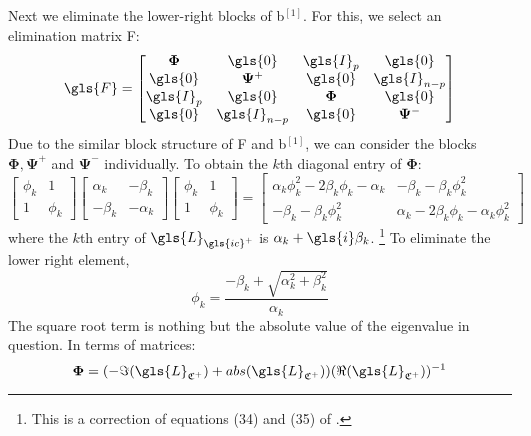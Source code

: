 Next we eliminate the lower-right blocks of \gls{b}$^{[1]}$. For this, we select
an elimination matrix \gls{F}:
\begin{align}
	\gls{F} = \begin{bmatrix}
		\mathbf{\Phi} & \gls{0} & \gls{I}_{p} & \gls{0} \\
		\gls{0} & \mathbf{\Psi}^+ & \gls{0} & \gls{I}_{n-p} \\
		\gls{I}_{p} & \gls{0} & \mathbf{\Phi} & \gls{0} \\
		\gls{0} & \gls{I}_{n-p} & \gls{0} & \mathbf{\Psi}^-
	\end{bmatrix}
\end{align}
Due to the similar block structure of \gls{F} and \gls{b}$^{[1]}$, we can
consider the blocks $\mathbf{\Phi}, \mathbf{\Psi}^+$ and $\mathbf{\Psi}^-$
individually. To obtain the $k$th diagonal entry of $\mathbf{\Phi}$:
\begin{equation}
\begin{bmatrix}
\phi_k & 1\\
1 & \phi_k   
\end{bmatrix}
\begin{bmatrix}
\alpha_k & -\beta_k\\
-\beta_k & -\alpha_k   
\end{bmatrix}
\begin{bmatrix}
\phi_k & 1\\
1 & \phi_k   
\end{bmatrix} = 
\begin{bmatrix}
\alpha_k\phi_k^2 - 2\beta_k\phi_k -\alpha_k  & -\beta_k - \beta_k\phi_k^2\\
-\beta_k - \beta_k\phi_k^2 & \alpha_k - 2\beta_k\phi_k -\alpha_k\phi_k^2 
\end{bmatrix}
\end{equation}
where the $k$th entry of $\gls{L}_{\gls{ic}^+}$ is $\alpha_k + \gls{i}\beta_k$.
\footnote{This is a correction of equations (34) and (35) of \citet{Chu200896}.}
To eliminate the lower right element,
\begin{equation}
\label{eqn:phi_sc}
\phi_k = \frac{-\beta_k + \sqrt{\alpha_k^2 + \beta_k^2}}{\alpha_k}
\end{equation}
The square root term is nothing but the absolute value of the 
eigenvalue in question. In terms of matrices:
\begin{equation}
\mathbf{\Phi} = (-\Im(\gls{L}_{\mathfrak{C}^+}) + abs(\gls{L}_{\mathfrak{C}^+}))(\Re(\gls{L}_{\mathfrak{C}^+}))^{-1} \label{eqn:phi}
\end{equation}
